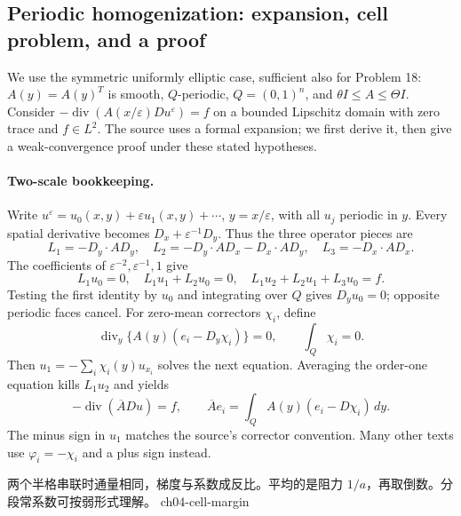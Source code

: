 \Needspace{35mm}
\subsection{Periodic homogenization: expansion, cell problem, and a proof}
\label{sec:4-homogenization}
We use the symmetric uniformly elliptic case, sufficient also for
Problem 18: $A(y)=A(y)^T$ is smooth, $Q$-periodic,
$Q=(0,1)^n$, and $\theta I\leq A\leq\Theta I$.
Consider $-\operatorname{div}(A(x/\varepsilon)Du^\varepsilon)=f$
on a bounded Lipschitz domain with zero trace and $f\in L^2$.
The source uses a formal expansion; we first derive it, then give
a weak-convergence proof under these stated hypotheses.

\paragraph{Two-scale bookkeeping.}
Write $u^\varepsilon=u_0(x,y)+\varepsilon u_1(x,y)+\cdots$,
$y=x/\varepsilon$, with all $u_j$ periodic in $y$.
Every spatial derivative becomes $D_x+\varepsilon^{-1}D_y$.
Thus the three operator pieces are
\[
 L_1=-D_y\cdot AD_y,\quad
 L_2=-D_y\cdot AD_x-D_x\cdot AD_y,\quad
 L_3=-D_x\cdot AD_x .
\]
The coefficients of $\varepsilon^{-2},\varepsilon^{-1},1$ give
\[
 L_1u_0=0,\quad L_1u_1+L_2u_0=0,\quad
 L_1u_2+L_2u_1+L_3u_0=f .
\]
Testing the first identity by $u_0$ and integrating over $Q$ gives
$D_yu_0=0$; opposite periodic faces cancel.
For zero-mean correctors $\chi_i$, define
\[
 \operatorname{div}_y\{A(y)(e_i-D_y\chi_i)\}=0,\qquad
 \int_Q\chi_i=0 .
 \tag{CELL4}
\]
Then $u_1=-\sum_i\chi_i(y)u_{x_i}$ solves the next equation.
Averaging the order-one equation kills $L_1u_2$ and yields
\[
 -\operatorname{div}(\overline A Du)=f,\qquad
 \overline A e_i=\int_Q A(y)(e_i-D\chi_i)\,dy .
 \tag{HOM4}
\]
The minus sign in $u_1$ matches the source's corrector convention.
Many other texts use $\varphi_i=-\chi_i$ and a plus sign instead.

\Needspace{45mm}

{两个半格串联时通量相同，梯度与系数成反比。平均的是阻力 $1/a$，再取倒数。分段常系数可按弱形式理解。}
{ch04-cell-margin}

